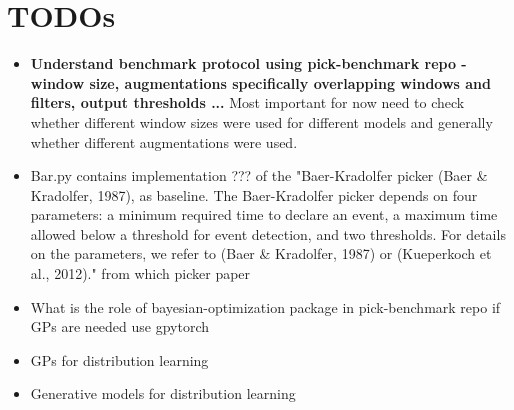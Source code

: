 \documentclass[11pt,a4paper]{article}
\begin{document}
\section{TODOs}
\begin{itemize}
\item \textbf{Understand benchmark protocol using pick-benchmark repo - window size, augmentations  specifically overlapping windows and filters, output thresholds ...} Most important for now need to check whether different window sizes were used for different models and generally whether different augmentations were used. 
\item Bar.py contains implementation ???  of the "Baer-Kradolfer picker (Baer \& Kradolfer, 1987), as
baseline. The Baer-Kradolfer picker depends on four parameters: a minimum required time to declare an event, a
maximum time allowed below a threshold for event detection, and two thresholds. For details on the parameters,
we refer to (Baer \& Kradolfer, 1987) or (Kueperkoch et al., 2012)." from which picker paper

\item What is the role of bayesian-optimization package in pick-benchmark repo if GPs are needed use gpytorch
\item GPs for distribution learning
\item Generative models for distribution learning
\end{itemize}
\end{document}
